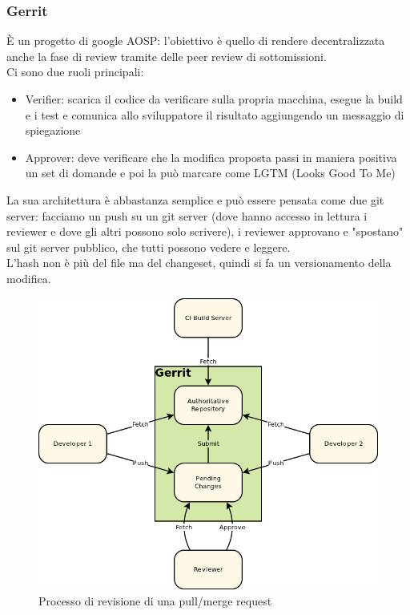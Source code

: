 \subsubsection{Gerrit}
È un progetto di google AOSP: l'obiettivo è quello di rendere decentralizzata anche la fase di review tramite delle peer review di sottomissioni. \\
Ci sono due ruoli principali:
\begin{itemize}
    \item Verifier: scarica il codice da verificare sulla propria macchina, esegue la build e i test e comunica allo sviluppatore il risultato aggiungendo un messaggio di spiegazione
    \item Approver: deve verificare che la modifica proposta passi in maniera positiva un set di domande e poi la può marcare come LGTM (Looks Good To Me)
\end{itemize}
La sua architettura è abbastanza semplice e può essere pensata come due git server:
facciamo un push su un git server (dove hanno accesso in lettura i reviewer e dove gli altri possono solo scrivere), i reviewer approvano e "spostano" sul git server pubblico, che tutti possono vedere e leggere.\\
L'hash non è più del file ma del changeset, quindi si fa un versionamento della modifica.


\begin{figure}[H]
	\begin{center}
    	 \includegraphics[scale=0.4]{img/gerrit.png}
    	 \caption{Processo di revisione di una pull/merge request}
 	\end{center}
\end{figure}

